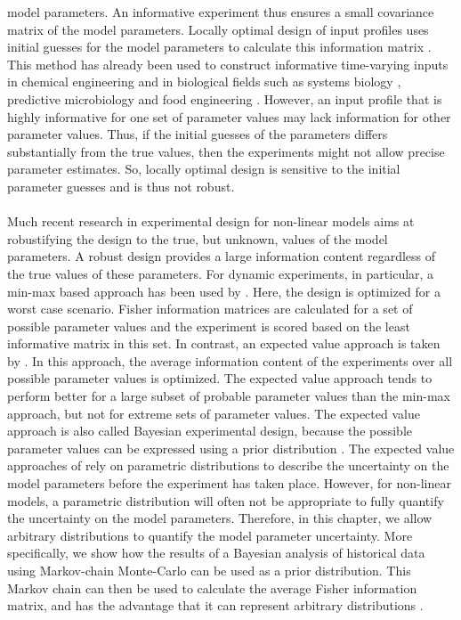 model parameters. An informative experiment thus ensures a small covariance matrix of the model parameters. Locally optimal design of input profiles uses initial guesses for the model parameters to calculate this information matrix \parencite{fedorov}. This method has already been used to construct informative time-varying inputs in chemical engineering \parencite{franceschini} and in biological fields such as systems biology \parencite{balsa1}, predictive microbiology \parencite{bernaerts1,bernaerts2} and food engineering \parencite{balsa2,nahor}. However, an input profile that is highly informative for one set of parameter values may lack information for other parameter values. Thus, if the initial guesses of the parameters differs substantially from the true values, then the experiments might not allow precise parameter estimates. So, locally optimal design is sensitive to the initial parameter guesses and is thus not robust.
\\
\\
Much recent research in experimental design for non-linear models aims at robustifying the design to the true, but unknown, values of the model parameters. A robust design provides a large information content regardless of the true values of these parameters. For dynamic experiments, in particular, a min-max based approach has been used by \textcite{bauer, korkel}. Here, the design is optimized for a worst case scenario. Fisher information matrices are calculated for a set of possible parameter values and the experiment is scored based on the least informative matrix in this set. In contrast, an expected value approach is taken by \textcite{schenkendorf, telen, nimmegeers}. In this approach, the average information content of the experiments over all possible parameter values is optimized. The expected value approach tends to perform better for a large subset of probable parameter values than the min-max approach, but not for extreme sets of parameter values. The expected value approach is also called Bayesian experimental design, because the possible parameter values can be expressed using a prior distribution \parencite{chaloner}. The expected value approaches of \textcite{telen, nimmegeers} rely on  parametric distributions to describe the uncertainty on the model parameters before the experiment has taken place. However, for non-linear models, a parametric distribution will often not be appropriate to fully quantify the uncertainty on the model parameters. Therefore, in this chapter, we allow arbitrary distributions to quantify the model parameter uncertainty. More specifically, we show how the results of a Bayesian analysis of historical data using Markov-chain Monte-Carlo can be used as a prior distribution. This Markov chain can then be used to calculate the average Fisher information matrix, and has the advantage that it can represent arbitrary distributions \parencite{gelman}.               
